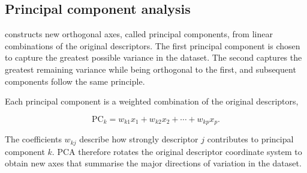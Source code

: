 \subsection{Principal component analysis}

 constructs new orthogonal axes, called principal components, from linear combinations of the original descriptors.
The first principal component is chosen to capture the greatest possible variance in the dataset.
The second captures the greatest remaining variance while being orthogonal to the first, and subsequent components follow the same principle.

Each principal component is a weighted combination of the original descriptors,

\begin{equation}
  \mathrm{PC}_k
  =
  w_{k1}x_1
  + w_{k2}x_2
  + \cdots
  + w_{kp}x_p.
\end{equation}

The coefficients $w_{kj}$ describe how strongly descriptor $j$ contributes to principal component $k$.
PCA therefore rotates the original descriptor coordinate system to obtain new axes that summarise the major directions of variation in the dataset.

